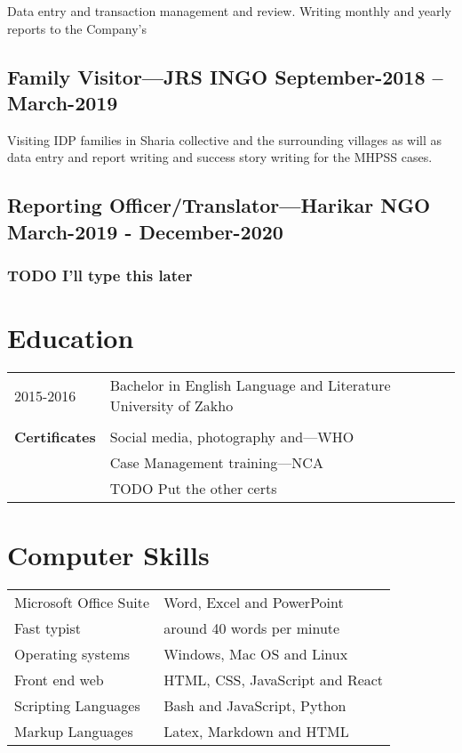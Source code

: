 \documentclass[11pt]{article}
\begin{document}
\noindent Data entry and transaction management and review.
Writing monthly and yearly reports to the Company's

\subsection*{Family Visitor---JRS INGO \hfill September-2018 – March-2019}
\label{sec:org5effccc}

\noindent Visiting IDP families in Sharia collective and the
surrounding villages as will as data entry and report
writing and success story writing for the MHPSS cases.

\subsection*{Reporting Officer/Translator---Harikar NGO \hfill March-2019 - December-2020}
\label{sec:org34d5f8e}

\subsubsection*{{\color{red}\bfseries\sffamily TODO} I'll type this later}
\label{sec:orgae474c1}

\section*{Education}
\label{sec:orgd471cf3}


\begin{tabular}{p{10em}|l}
2015-2016 & Bachelor in English Language and Literature University of Zakho\\
 & \\
\textbf{Certificates} & Social media, photography and---WHO\\
 & Case Management training---NCA\\
 & TODO Put the other certs\\
\end{tabular}

\newpage
\section*{Computer Skills}
\label{sec:orgc0a8aa6}


\begin{tabular}{p{10em}|l}
Microsoft Office Suite & Word, Excel and PowerPoint\\
Fast typist & around 40 words per minute\\
Operating systems & Windows, Mac OS and Linux\\
Front end web & HTML, CSS, JavaScript and React\\
Scripting Languages & Bash and JavaScript, Python\\
Markup Languages & Latex, Markdown and HTML\\
\end{tabular}
\end{document}
